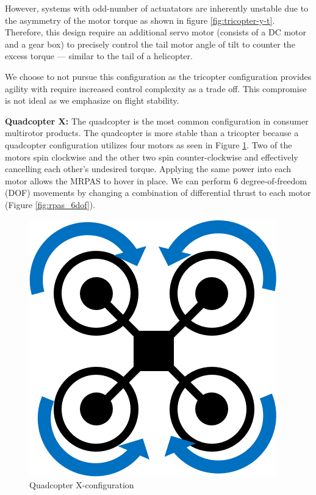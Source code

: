 However, systems with odd-number of actuatators are inherently unstable due to the asymmetry of the motor torque as shown in figure \ref{fig:tricopter-y-t}. Therefore, this design require an additional servo motor (consists of a DC motor and a gear box) to precisely control the tail motor angle of tilt to counter the excess torque --- similar to the tail of a helicopter.

We choose to not pursue this configuration as the tricopter configuration provides agility with require increased control complexity as a trade off. This compromise is not ideal as we emphasize on flight stability.

\textbf{Quadcopter X: }
The quadcopter is the most common configuration in consumer multirotor products. The quadcopter is more stable than a tricopter because a quadcopter configuration utilizes four motors as seen in Figure \ref{fig:quadcopter-x-t}. Two of the motors spin clockwise and the other two spin counter-clockwise and effectively cancelling each other’s undesired torque. Applying the same power into each motor allows the MRPAS to hover in place. We can perform 6 degree-of-freedom (DOF) movements by changing a combination of differential thrust to each motor (Figure \ref{fig:rpas_6dof}).

\begin{figure}[H]
    \centering
    \includegraphics[scale=0.4]{img/drone_xconfigt}
    \caption{Quadcopter X-configuration}
    \label{fig:quadcopter-x-t}
\end{figure}

